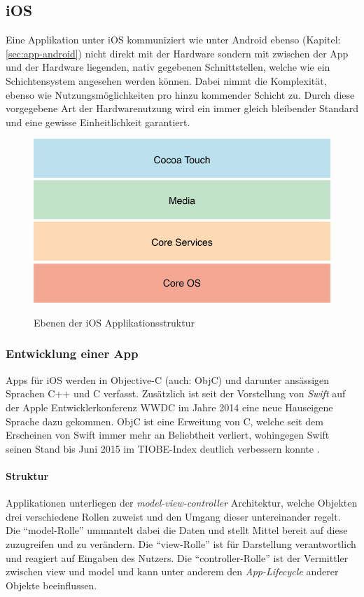 \subsection{iOS}
	Eine Applikation unter iOS kommuniziert wie unter Android ebenso (Kapitel:
	\ref{sec:app-android}) nicht direkt mit der Hardware sondern mit zwischen der
	App und der Hardware liegenden, nativ gegebenen Schnittstellen, welche wie ein
	Schichtensystem angesehen werden können. Dabei nimmt die Komplexität, ebenso wie
	Nutzungsmöglichkeiten pro hinzu kommender Schicht zu. Durch diese vorgegebene
	Art der Hardwarenutzung wird ein immer gleich bleibender Standard und eine
	gewisse Einheitlichkeit garantiert.
	\begin{figure}[h]
		\centering
		\includegraphics[width=0.5\linewidth]{ios/media/ios-layers.png}
		\caption{Ebenen der iOS Applikationsstruktur}
		\cite{AboutiOSTech2015}
		\label{fig:marcetshare}
	\end{figure}
	
	\subsubsection{Entwicklung einer App}
		Apps für iOS werden in Objective-C (auch: ObjC) und darunter ansässigen
		Sprachen C++ und C verfasst. Zusätzlich ist seit der Vorstellung von
		\textsl{Swift} auf der Apple Entwicklerkonferenz WWDC im Jahre 2014 eine
		neue Hauseigene Sprache dazu gekommen. ObjC ist eine Erweitung von C, welche
		seit dem Erscheinen von Swift immer mehr an Beliebtheit verliert, wohingegen
		Swift seinen Stand bis Juni 2015 im TIOBE-Index deutlich verbessern
		konnte \cite{TIOBE062015}.
		\paragraph{Struktur}
			Applikationen unterliegen der \textsl{model-view-controller} Architektur,
			welche Objekten drei verschiedene Rollen zuweist und den Umgang dieser
			untereinander regelt. Die "`model-Rolle"' ummantelt dabei die Daten und stellt
			Mittel bereit auf diese zuzugreifen und zu verändern. Die "`view-Rolle"' ist
			für Darstellung verantwortlich und reagiert auf Eingaben des Nutzers. Die
			"`controller-Rolle"' ist der Vermittler zwischen view und model und kann
			unter anderem den \textsl{App-Lifecycle} anderer Objekte beeinflussen.
